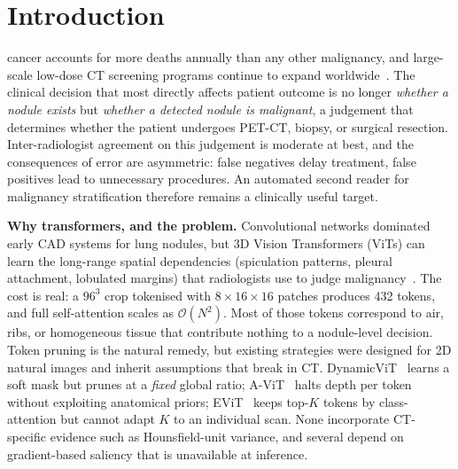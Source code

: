 \documentclass[journal]{IEEEtran}
\begin{document}
\section{Introduction}
 cancer accounts for more deaths annually than any other
malignancy, and large-scale low-dose CT screening programs continue to expand
worldwide~\cite{nlst2011,nelson2020}. The clinical decision that most directly
affects patient outcome is no longer \emph{whether a nodule exists} but
\emph{whether a detected nodule is malignant}, a judgement that determines
whether the patient undergoes PET-CT, biopsy, or surgical resection.
Inter-radiologist agreement on this judgement is moderate at best, and the
consequences of error are asymmetric: false negatives delay treatment, false
positives lead to unnecessary procedures. An automated second reader for
malignancy stratification therefore remains a clinically useful target.

\textbf{Why transformers, and the problem.} Convolutional networks dominated
early CAD systems for lung nodules, but 3D Vision Transformers (ViTs) can
learn the long-range spatial dependencies (spiculation patterns, pleural
attachment, lobulated margins) that radiologists use to judge
malignancy~\cite{he2021}. The cost is real: a $96^3$ crop tokenised with
$8\!\times\!16\!\times\!16$ patches produces 432 tokens, and full
self-attention scales as $\mathcal{O}(N^2)$. Most of those tokens correspond
to air, ribs, or homogeneous tissue that contribute nothing to a nodule-level
decision. Token pruning is the natural remedy, but existing strategies were
designed for 2D natural images and inherit assumptions that break in CT.
DynamicViT~\cite{dynamicvit} learns a soft mask but prunes at a \emph{fixed}
global ratio; A-ViT~\cite{avit} halts depth per token without exploiting
anatomical priors; EViT~\cite{evit} keeps top-$K$ tokens by class-attention
but cannot adapt $K$ to an individual scan. None incorporate CT-specific
evidence such as Hounsfield-unit variance, and several depend on gradient-based
saliency that is unavailable at inference.
\end{document}
